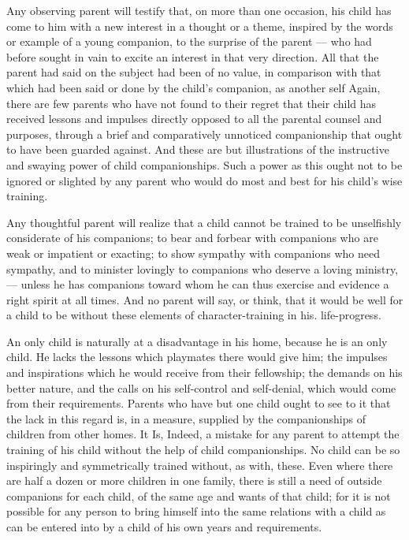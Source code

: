 \documentclass[
]{book}
\begin{document}
Any observing parent will testify that, on more than one occasion, his child has come to him with a new interest in a thought or a theme, inspired by the words or example of a young companion, to the surprise of the parent --- who had before sought in vain to excite an interest in that very direction. All that the parent had said on the subject had been of no value, in comparison with that which had been said or done by the child's companion, as another self Again, there are few parents who have not found to their regret that their child has received lessons and impulses directly opposed to all the parental counsel and purposes, through a brief and comparatively unnoticed companionship that ought to have been guarded against. And these are but illustrations of the instructive and swaying power of child companionships. Such a power as this ought not to be ignored or slighted by any parent who would do most and best for his child's wise training.

Any thoughtful parent will realize that a child cannot be trained to be unselfishly considerate of his companions; to bear and forbear with companions who are weak or impatient or exacting; to show sympathy with companions who need sympathy, and to minister lovingly to companions who deserve a loving ministry, --- unless he has companions toward whom he can thus exercise and evidence a right spirit at all times. And no parent will say, or think, that it would be well for a child to be without these elements of character-training in his. life-progress.

An only child is naturally at a disadvantage in his home, because he is an only child. He lacks the lessons which playmates there would give him; the impulses and inspirations which he would receive from their fellowship; the demands on his better nature, and the calls on his self-control and self-denial, which would come from their requirements. Parents who have but one child ought to see to it that the lack in this regard is, in a measure, supplied by the companionships of children from other homes. It Is, Indeed, a mistake for any parent to attempt the training of his child without the help of child companionships. No child can be so inspiringly and symmetrically trained without, as with, these. Even where there are half a dozen or more children in one family, there is still a need of outside companions for each child, of the same age and wants of that child; for it is not possible for any person to bring himself into the same relations with a child as can be entered into by a child of his own years and requirements.
\end{document}
